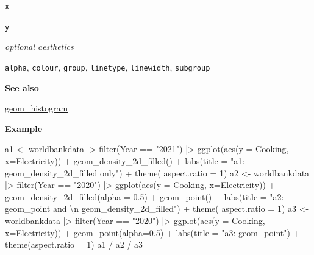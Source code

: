 \documentclass[
  letterpaper,
  DIV=11,
  numbers=noendperiod]{scrreprt}
\newenvironment{Shaded}{\begin{snugshade}}{\end{snugshade}}
\newcommand{\AttributeTok}[1]{\textcolor[rgb]{0.40,0.45,0.13}{#1}}
\newcommand{\DecValTok}[1]{\textcolor[rgb]{0.68,0.00,0.00}{#1}}
\newcommand{\FloatTok}[1]{\textcolor[rgb]{0.68,0.00,0.00}{#1}}
\newcommand{\FunctionTok}[1]{\textcolor[rgb]{0.28,0.35,0.67}{#1}}
\newcommand{\NormalTok}[1]{\textcolor[rgb]{0.00,0.23,0.31}{#1}}
\newcommand{\OtherTok}[1]{\textcolor[rgb]{0.00,0.23,0.31}{#1}}
\newcommand{\SpecialCharTok}[1]{\textcolor[rgb]{0.37,0.37,0.37}{#1}}
\newcommand{\StringTok}[1]{\textcolor[rgb]{0.13,0.47,0.30}{#1}}
\begin{document}
\texttt{x}

\texttt{y}

\emph{optional aesthetics}

\texttt{alpha}, \texttt{colour}, \texttt{group}, \texttt{linetype},
\texttt{linewidth}, \texttt{subgroup}

\textbf{See also}

\hyperref[hist]{geom\_histogram}

\textbf{Example}

\begin{Shaded}
\begin{Highlighting}[]
\NormalTok{a1 }\OtherTok{\textless{}{-}}\NormalTok{ worldbankdata }\SpecialCharTok{|\textgreater{}}
  \FunctionTok{filter}\NormalTok{(Year }\SpecialCharTok{==} \StringTok{"2021"}\NormalTok{) }\SpecialCharTok{|\textgreater{}}
  \FunctionTok{ggplot}\NormalTok{(}\FunctionTok{aes}\NormalTok{(}\AttributeTok{y =}\NormalTok{ Cooking, }\AttributeTok{x=}\NormalTok{Electricity)) }\SpecialCharTok{+}   
  \FunctionTok{geom\_density\_2d\_filled}\NormalTok{() }\SpecialCharTok{+} 
  \FunctionTok{labs}\NormalTok{(}\AttributeTok{title =} \StringTok{"a1: geom\_density\_2d\_filled only"}\NormalTok{) }\SpecialCharTok{+} 
  \FunctionTok{theme}\NormalTok{( }\AttributeTok{aspect.ratio =} \DecValTok{1}\NormalTok{)}
\NormalTok{a2 }\OtherTok{\textless{}{-}}\NormalTok{ worldbankdata }\SpecialCharTok{|\textgreater{}}
  \FunctionTok{filter}\NormalTok{(Year }\SpecialCharTok{==} \StringTok{"2020"}\NormalTok{) }\SpecialCharTok{|\textgreater{}}
  \FunctionTok{ggplot}\NormalTok{(}\FunctionTok{aes}\NormalTok{(}\AttributeTok{y =}\NormalTok{ Cooking, }\AttributeTok{x=}\NormalTok{Electricity)) }\SpecialCharTok{+}   
  \FunctionTok{geom\_density\_2d\_filled}\NormalTok{(}\AttributeTok{alpha =} \FloatTok{0.5}\NormalTok{) }\SpecialCharTok{+} 
    \FunctionTok{geom\_point}\NormalTok{() }\SpecialCharTok{+} 
  \FunctionTok{labs}\NormalTok{(}\AttributeTok{title =} \StringTok{"a2: geom\_point and }\SpecialCharTok{\textbackslash{}n}\StringTok{ geom\_density\_2d\_filled"}\NormalTok{) }\SpecialCharTok{+} 
  \FunctionTok{theme}\NormalTok{( }\AttributeTok{aspect.ratio =} \DecValTok{1}\NormalTok{)}
\NormalTok{a3 }\OtherTok{\textless{}{-}}\NormalTok{ worldbankdata }\SpecialCharTok{|\textgreater{}}
  \FunctionTok{filter}\NormalTok{(Year }\SpecialCharTok{==} \StringTok{"2020"}\NormalTok{) }\SpecialCharTok{|\textgreater{}}
  \FunctionTok{ggplot}\NormalTok{(}\FunctionTok{aes}\NormalTok{(}\AttributeTok{y =}\NormalTok{ Cooking, }\AttributeTok{x=}\NormalTok{Electricity)) }\SpecialCharTok{+}   
  \FunctionTok{geom\_point}\NormalTok{(}\AttributeTok{alpha=}\FloatTok{0.5}\NormalTok{) }\SpecialCharTok{+} 
  \FunctionTok{labs}\NormalTok{(}\AttributeTok{title =} \StringTok{"a3: geom\_point"}\NormalTok{) }\SpecialCharTok{+} 
  \FunctionTok{theme}\NormalTok{(}\AttributeTok{aspect.ratio =} \DecValTok{1}\NormalTok{)}
\NormalTok{a1 }\SpecialCharTok{/}\NormalTok{ a2 }\SpecialCharTok{/}\NormalTok{ a3}
\end{Highlighting}
\end{Shaded}
\end{document}
